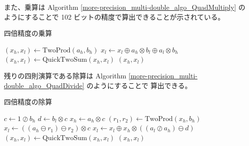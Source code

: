 また、乗算は
Algorithm \ref{more-precision_multi-double_algo_QuadMultiply} のようにすることで
102 ビットの精度で算出できることが示されている\cite{Naoya2012}。

\begin{algorithm}[p]
    \caption{四倍精度の乗算\cite{Hisashi2006,Naoya2012}}
    \label{more-precision_multi-double_algo_QuadMultiply}
    \begin{algorithmic}
        \State $(x_h, x_l) \gets \text{TwoProd}(a_h, b_h)$
        \State $x_l \gets x_l \oplus a_h \otimes b_l \oplus a_l \otimes b_h$
        \State $(x_h, x_l) \gets \text{QuickTwoSum}(x_h, x_l)$
        \State \Return $(x_h, x_l)$
        \EndProcedure
    \end{algorithmic}
\end{algorithm}

残りの四則演算である除算は
Algorithm \ref{more-precision_multi-double_algo_QuadDivide} のようにすることで
算出できる\cite{Naoya2012s}。

\begin{algorithm}[p]
    \caption{四倍精度の除算\cite{Naoya2012s}}
    \label{more-precision_multi-double_algo_QuadDivide}
    \begin{algorithmic}
        \State $c \gets 1 \oslash b_h$
        \State $d \gets b_l \otimes c$
        \State $x_h \gets a_h \otimes c$
        \State $(r_1, r_2) \gets \text{TwoProd}(x_h, b_h)$
        \State $x_l \gets ((a_h \ominus r_1) \ominus r_2) \otimes c$
        \State $x_l \gets x_l \oplus x_h \otimes ((a_l \oslash a_h) \ominus d)$
        \State $(x_h, x_l) \gets \text{QuickTwoSum}(x_h, x_l)$
        \State \Return $(x_h, x_l)$
        \EndProcedure
    \end{algorithmic}
\end{algorithm}
